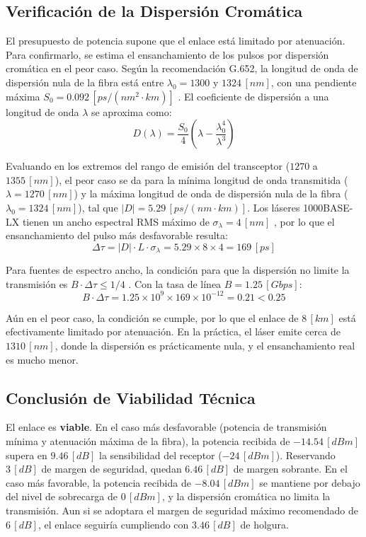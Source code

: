 \subsection{Verificación de la Dispersión Cromática}
\label{sec_3.6}
El presupuesto de potencia supone que el enlace está limitado por atenuación. Para confirmarlo, se estima el ensanchamiento de los pulsos por dispersión cromática en el peor caso. Según la recomendación G.652, la longitud de onda de dispersión nula de la fibra está entre $\lambda_0 = 1300$ y $1324 \, [nm]$, con una pendiente máxima $S_{0} = 0.092 \, [ps/(nm^2 \cdot km)]$ \cite{b5}. El coeficiente de dispersión a una longitud de onda $\lambda$ se aproxima como:
\begin{equation}
    D(\lambda) = \frac{S_{0}}{4} \left(\lambda - \frac{\lambda_{0}^{4}}{\lambda^{3}}\right)
    \label{eq_14}
\end{equation}

Evaluando en los extremos del rango de emisión del transceptor ($1270$ a $1355 \, [nm]$), el peor caso se da para la mínima longitud de onda transmitida ($\lambda = 1270 \, [nm]$) y la máxima longitud de onda de dispersión nula de la fibra ($\lambda_{0} = 1324 \, [nm]$), tal que $|D| = 5.29 \, [ps/(nm \cdot km)]$. Los láseres 1000BASE-LX tienen un ancho espectral RMS máximo de $\sigma_{\lambda} = 4 \, [nm]$ \cite{b14}, por lo que el ensanchamiento del pulso más desfavorable resulta:
\begin{equation}
    \Delta\tau = |D| \cdot L \cdot \sigma_{\lambda} = 5.29 \times 8 \times 4 = 169 \, [ps]
    \label{eq_15}
\end{equation}

Para fuentes de espectro ancho, la condición para que la dispersión no limite la transmisión es $B \cdot \Delta\tau \leq 1/4$ \cite{b15}. Con la tasa de línea $B = 1.25 \, [Gbps]$:
\begin{equation}
    B \cdot \Delta\tau = 1.25 \times 10^{9} \times 169 \times 10^{-12} = 0.21 < 0.25
    \label{eq_16}
\end{equation}

Aún en el peor caso, la condición se cumple, por lo que el enlace de $8 \, [km]$ está efectivamente limitado por atenuación. En la práctica, el láser emite cerca de $1310 \, [nm]$, donde la dispersión es prácticamente nula, y el ensanchamiento real es mucho menor.


\subsection{Conclusión de Viabilidad Técnica}
\label{sec_3.5}
El enlace es \textbf{viable}. En el caso más desfavorable (potencia de transmisión mínima y atenuación máxima de la fibra), la potencia recibida de $-14.54 \, [dBm]$ supera en $9.46 \, [dB]$ la sensibilidad del receptor ($-24 \, [dBm]$). Reservando $3 \, [dB]$ de margen de seguridad, quedan $6.46 \, [dB]$ de margen sobrante. En el caso más favorable, la potencia recibida de $-8.04 \, [dBm]$ se mantiene por debajo del nivel de sobrecarga de $0 \, [dBm]$, y la dispersión cromática no limita la transmisión. Aun si se adoptara el margen de seguridad máximo recomendado de $6 \, [dB]$, el enlace seguiría cumpliendo con $3.46 \, [dB]$ de holgura.
